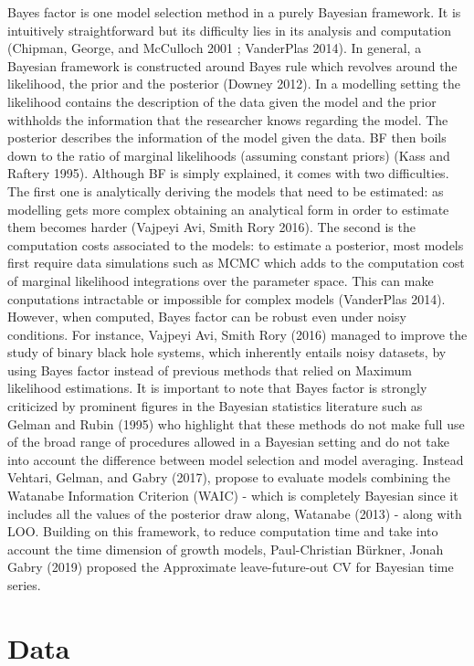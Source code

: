 \documentclass[12pt,]{article}
\begin{document}
Bayes factor is one model selection method in a purely Bayesian framework. It is intuitively straightforward but its difficulty lies in its analysis and computation (Chipman, George, and McCulloch 2001 ; VanderPlas 2014). In general, a Bayesian framework is constructed around Bayes rule which revolves around the likelihood, the prior and the posterior (Downey 2012). In a modelling setting the likelihood contains the description of the data given the model and the prior withholds the information that the researcher knows regarding the model. The posterior describes the information of the model given the data. BF then boils down to the ratio of marginal likelihoods (assuming constant priors) (Kass and Raftery 1995).
Although BF is simply explained, it comes with two difficulties. The first one is analytically deriving the models that need to be estimated: as modelling gets more complex obtaining an analytical form in order to estimate them becomes harder (Vajpeyi Avi, Smith Rory 2016). The second is the computation costs associated to the models: to estimate a posterior, most models first require data simulations such as MCMC which adds to the computation cost of marginal likelihood integrations over the parameter space. This can make conputations intractable or impossible for complex models (VanderPlas 2014). However, when computed, Bayes factor can be robust even under noisy conditions. For instance, Vajpeyi Avi, Smith Rory (2016) managed to improve the study of binary black hole systems, which inherently entails noisy datasets, by using Bayes factor instead of previous methods that relied on Maximum likelihood estimations. It is important to note that Bayes factor is strongly criticized by prominent figures in the Bayesian statistics literature such as Gelman and Rubin (1995) who highlight that these methods do not make full use of the broad range of procedures allowed in a Bayesian setting and do not take into account the difference between model selection and model averaging. Instead Vehtari, Gelman, and Gabry (2017), propose to evaluate models combining the Watanabe Information Criterion (WAIC) - which is completely Bayesian since it includes all the values of the posterior draw along, Watanabe (2013) - along with LOO. Building on this framework, to reduce computation time and take into account the time dimension of growth models, Paul-Christian Bürkner, Jonah Gabry (2019) proposed the Approximate leave-future-out CV for Bayesian time series.

\hypertarget{data}{%
\section{Data}\label{data}}
\end{document}

